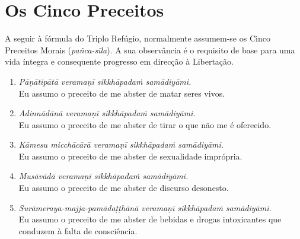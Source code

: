 \section{Os Cinco Preceitos}

A seguir à fórmula do Triplo Refúgio, normalmente assumem-se os Cinco Preceitos
Morais (\emph{pañca-sīla}). A sua observância é o requisito de base para uma
vida íntegra e consequente progresso em direcção à Libertação.

\begin{enumerate}
  \item \emph{Pāṇātipātā veramaṇī sikkhāpadaṁ samādiyāmi.}\\
        Eu assumo o preceito de me abster de matar seres vivos.

  \item \emph{Adinnādānā veramaṇī sikkhāpadaṁ samādiyāmi.}\\
        Eu assumo o preceito de me abster de tirar o que não me é oferecido.

  \item \emph{Kāmesu micchācārā veramaṇī sikkhāpadaṁ samādiyāmi.}\\
        Eu assumo o preceito de me abster de sexualidade imprópria.

  \item \emph{Musāvādā veramaṇī sikkhāpadaṁ samādiyāmi.}\\
        Eu assumo o preceito de me abster de discurso desonesto.

  \item \emph{Surāmeraya-majja-pamādaṭṭhānā veramaṇī sikkhāpadaṁ samādiyāmi.}\\
        Eu assumo o preceito de me abster de bebidas e drogas intoxicantes que
        conduzem à falta de consciência.
\end{enumerate}

